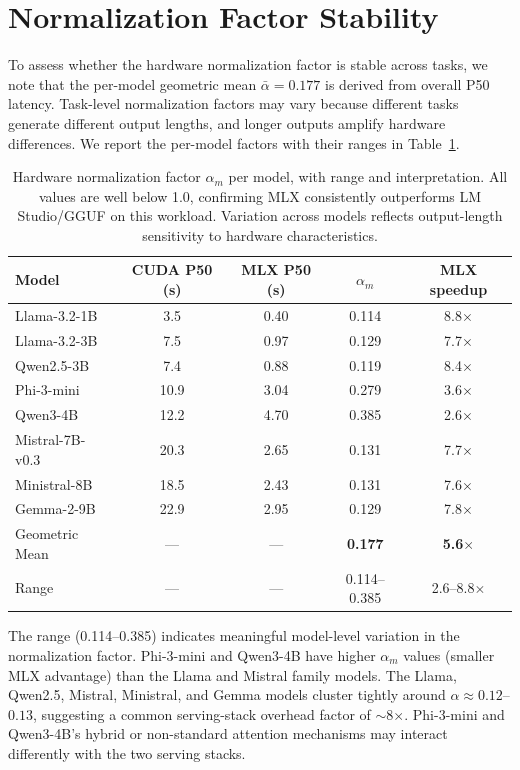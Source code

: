 \documentclass[11pt]{article}
\begin{document}
\section{Normalization Factor Stability}
\label{app:normalization-stability}

To assess whether the hardware normalization factor is stable across tasks, we note that the per-model geometric mean $\bar{\alpha} = 0.177$ is derived from overall P50 latency.  Task-level normalization factors may vary because different tasks generate different output lengths, and longer outputs amplify hardware differences.  We report the per-model factors with their ranges in Table~\ref{tab:app-normalization-stability}.

\begin{table}[t]
\centering
\caption{Hardware normalization factor $\alpha_m$ per model, with range and interpretation.  All values are well below 1.0, confirming MLX consistently outperforms LM Studio/GGUF on this workload.  Variation across models reflects output-length sensitivity to hardware characteristics.}
\label{tab:app-normalization-stability}
\small
\begin{tabular}{lcccc}
\toprule
\textbf{Model} & \textbf{CUDA P50 (s)} & \textbf{MLX P50 (s)} & \textbf{$\alpha_m$} & \textbf{MLX speedup} \\
\midrule
Llama-3.2-1B   & 3.5  & 0.40 & 0.114 & 8.8$\times$ \\
Llama-3.2-3B   & 7.5  & 0.97 & 0.129 & 7.7$\times$ \\
Qwen2.5-3B     & 7.4  & 0.88 & 0.119 & 8.4$\times$ \\
Phi-3-mini      & 10.9 & 3.04 & 0.279 & 3.6$\times$ \\
Qwen3-4B        & 12.2 & 4.70 & 0.385 & 2.6$\times$ \\
Mistral-7B-v0.3 & 20.3 & 2.65 & 0.131 & 7.7$\times$ \\
Ministral-8B    & 18.5 & 2.43 & 0.131 & 7.6$\times$ \\
Gemma-2-9B      & 22.9 & 2.95 & 0.129 & 7.8$\times$ \\
\midrule
Geometric Mean & --- & --- & \textbf{0.177} & \textbf{5.6$\times$} \\
Range          & --- & --- & 0.114--0.385 & 2.6--8.8$\times$ \\
\bottomrule
\end{tabular}
\end{table}

The range (0.114--0.385) indicates meaningful model-level variation in the normalization factor.  Phi-3-mini and Qwen3-4B have higher $\alpha_m$ values (smaller MLX advantage) than the Llama and Mistral family models.  The Llama, Qwen2.5, Mistral, Ministral, and Gemma models cluster tightly around $\alpha \approx 0.12$--$0.13$, suggesting a common serving-stack overhead factor of $\sim$8$\times$.  Phi-3-mini and Qwen3-4B's hybrid or non-standard attention mechanisms may interact differently with the two serving stacks.
\end{document}
